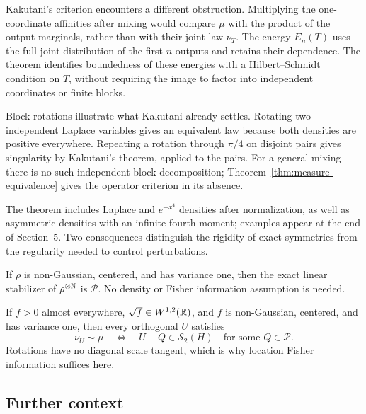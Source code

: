 Kakutani's criterion encounters a different obstruction. Multiplying the
one-coordinate affinities after mixing would compare \(\mu\) with the
product of the output marginals, rather than with their joint law
\(\nu_T\). The energy \(E_n(T)\) uses the full joint distribution of the
first \(n\) outputs and retains their dependence. The theorem identifies
boundedness of these energies with a Hilbert--Schmidt condition on \(T\),
without requiring the image to factor into independent coordinates or
finite blocks.

Block rotations illustrate what Kakutani already settles. Rotating two
independent Laplace variables gives an equivalent law because both
densities are positive everywhere. Repeating a rotation through
\(\pi/4\) on disjoint pairs gives singularity by Kakutani's theorem,
applied to the pairs. For a general mixing there is no such independent
block decomposition; Theorem~\ref{thm:measure-equivalence} gives the
operator criterion in its absence.

The theorem includes Laplace and \(e^{-x^4}\) densities after normalization,
as well as asymmetric densities with an infinite fourth moment; examples
appear at the end of Section~5. Two consequences distinguish the rigidity
of exact symmetries from the regularity needed to control perturbations.

\begin{corollary}
\label{cor:moment-only-stabilizer}
If \(\rho\) is non-Gaussian, centered, and has variance one, then the exact
linear stabilizer of \(\rho^{\otimes\mathbb N}\) is \(\mathcal P\).  No density or
Fisher information assumption is needed.
\end{corollary}

\begin{corollary}
\label{cor:orthogonal-equivalence}
If \(f>0\) almost everywhere, \(\sqrt f\in W^{1,2}(\mathbb R)\), and \(f\) is
non-Gaussian, centered, and has variance one, then every orthogonal \(U\)
satisfies
\[
 \nu_U\sim\mu
 \quad\Longleftrightarrow\quad
 U-Q\in\mathcal S_2(H)\quad\text{for some }Q\in\mathcal P.
\]
Rotations have no diagonal scale tangent, which is why location Fisher
information suffices here.
\end{corollary}

\subsection{Further context}

